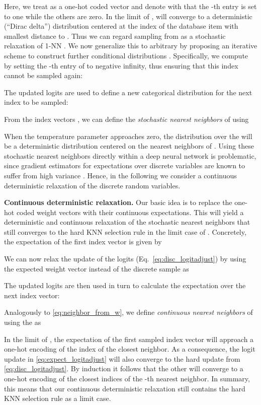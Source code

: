 \documentclass{article}
\newcommand{\myparagraph}[1]{\smallskip\noindent\textbf{#1}}
\begin{document}
Here, we treat  as a one-hot coded vector and denote with  that the -th entry is set to one while the others are zero. 
In the limit of ,  will converge to a deterministic (``Dirac delta'') distribution centered at the index of the database item with smallest distance to .
Thus we can regard sampling from  as a stochastic relaxation of 1-NN \cite{Goldberger:2005:NCA}.
We now generalize this to arbitrary  by proposing an iterative scheme to construct further conditional distributions . 
Specifically, we compute  by setting the -th entry of 
to negative infinity, thus ensuring that this index cannot be sampled again:

The updated logits are used to define a new categorical distribution for the
next index to be sampled:

From the index vectors , we can define the \emph{stochastic nearest neighbors}  of  using

When the temperature parameter  approaches zero, the distribution over
the  will be a deterministic distribution centered on the  nearest neighbors of .
Using these stochastic nearest neighbors directly within a deep neural network is problematic, since gradient estimators for expectations over discrete variables are
known to suffer from high variance \cite{Mnih:2016:VIM}. 
Hence, in the following we consider a continuous deterministic relaxation of the discrete random variables.

\myparagraph{Continuous deterministic relaxation.} 
Our basic idea is to replace the one-hot coded weight vectors with their continuous expectations.
This will yield a deterministic and continuous relaxation of the stochastic nearest neighbors that still converges to the hard KNN selection rule in the limit case of .
Concretely, the expectation  of the first index vector  is given by

We can now relax the update of the logits (Eq.~\ref{eq:disc_logitadjust}) by using the expected weight vector instead of the discrete sample as

The updated logits are then used in turn to calculate the expectation over the next index vector:

Analogously to \cref{eq:neighbor_from_w}, we define \emph{continuous nearest neighbors}  of  using the  as

In the limit of , the expectation  of the first sampled index vector will approach a one-hot encoding of the index of the closest neighbor. 
As a consequence, the logit update in \cref{eq:expect_logitadjust} will also converge to the hard update from \cref{eq:disc_logitadjust}.
By induction it follows that the other  will converge to a one-hot encoding of the closest indices of the -th nearest neighbor.
In summary, this means that our continuous deterministic relaxation still contains the hard KNN selection rule as a limit case.
\end{document}
